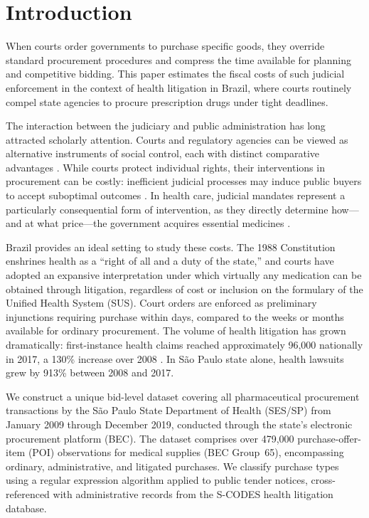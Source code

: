 \section{Introduction}
\label{sec:introduction}

When courts order governments to purchase specific goods, they override standard procurement procedures and compress the time available for planning and competitive bidding. This paper estimates the fiscal costs of such judicial enforcement in the context of health litigation in Brazil, where courts routinely compel state agencies to procure prescription drugs under tight deadlines.

The interaction between the judiciary and public administration has long attracted scholarly attention. Courts and regulatory agencies can be viewed as alternative instruments of social control, each with distinct comparative advantages \citep{glaeser2003rise}. While courts protect individual rights, their interventions in procurement can be costly: inefficient judicial processes may induce public buyers to accept suboptimal outcomes \citep{coviello2018bidding}. In health care, judicial mandates represent a particularly consequential form of intervention, as they directly determine how---and at what price---the government acquires essential medicines \citep{wang2015right, ferraz2009right}.

Brazil provides an ideal setting to study these costs. The 1988 Constitution enshrines health as a ``right of all and a duty of the state,'' and courts have adopted an expansive interpretation under which virtually any medication can be obtained through litigation, regardless of cost or inclusion on the formulary of the Unified Health System (SUS). Court orders are enforced as preliminary injunctions requiring purchase within days, compared to the weeks or months available for ordinary procurement. The volume of health litigation has grown dramatically: first-instance health claims reached approximately 96,000 nationally in 2017, a 130\% increase over 2008 \citep{cnj2019judicializacao}. In S\~ao Paulo state alone, health lawsuits grew by 913\% between 2008 and 2017.

We construct a unique bid-level dataset covering all pharmaceutical procurement transactions by the S\~ao Paulo State Department of Health (SES/SP) from January 2009 through December 2019, conducted through the state's electronic procurement platform (BEC). The dataset comprises over 479,000 purchase-offer-item (POI) observations for medical supplies (BEC Group~65), encompassing ordinary, administrative, and litigated purchases. We classify purchase types using a regular expression algorithm applied to public tender notices, cross-referenced with administrative records from the S-CODES health litigation database.

